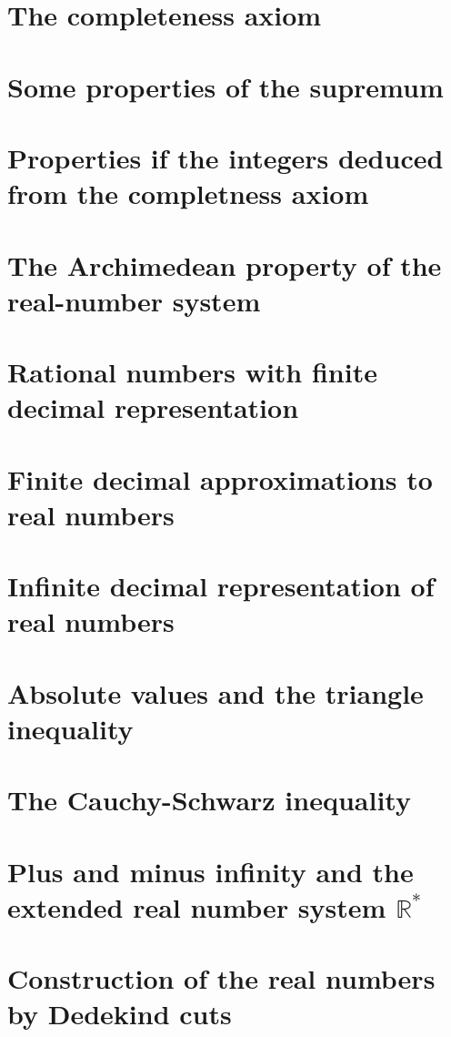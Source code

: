 \documentclass[class=mike-apostol-mathematical-analysis,crop=false]{standalone}
\begin{document}
\section{The completeness axiom}

\section{Some properties of the supremum}

\section{Properties if the integers deduced from the completness axiom}

\section{The Archimedean property of the real-number system}

\section{Rational numbers with finite decimal representation}

\section{Finite decimal approximations to real numbers}

\section{Infinite decimal representation of real numbers}

\section{Absolute values and the triangle inequality}

\section{The Cauchy-Schwarz inequality}

\section{Plus and minus infinity and the extended real number system $\mathbb{R}^{*}$}

\section*{Construction of the real numbers by Dedekind cuts}
\end{document}
